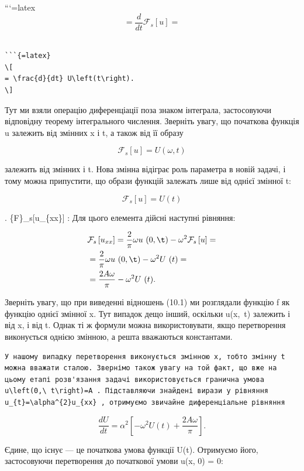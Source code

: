 \documentclass[
  ukrainian,
]{article}
\begin{document}
```{=latex}
\[
= \frac{d}{dt} \mathcal{F}_{s}\left[u\right] =
\]

\begin{verbatim}

```{=latex}
\[
= \frac{d}{dt} U\left(t\right).
\]
\end{verbatim}

Тут ми взяли операцію диференціації поза знаком інтеграла, застосовуючи
відповідну теорему інтегрального числення. Зверніть увагу, що початкова
функція u залежить від змінних x і t, а також від її образу

\[
\mathcal{F}_{s}[u] = U(\omega, t)
\]

залежить від змінних \omega і t. Нова змінна \omega відіграє роль
параметра в новій задачі, і тому можна припустити, що образи функцій
залежать лише від однієї змінної t:

\[
\mathcal{F}_s[u] = U(t)
\]

. \{\mathscr F\}\_s{[}u\_\{xx\}{]} : Для цього елемента дійсні наступні
рівняння:

\[
\begin{split} &\mathcal{F}_s\left[u_{xx}\right] = \frac{2}{\pi} \omega u \ (0, \t) - \omega^2 \mathcal{F}_s\left[u\right] = \\ &= \frac{2}{\pi} \omega u \ (0, \t) - \omega^2 U \ (t) = \\ &= \frac{2A\omega}{\pi} - \omega^2 U \ (t). \end{split}
\]

Зверніть увагу, що при виведенні відношень (10.1) ми розглядали функцію
f як функцію однієї змінної x. Тут випадок дещо інший, оскільки
u\left(x,~t\right) залежить і від x, і від t. Однак ті ж формули можна
використовувати, якщо перетворення виконується однією змінною, а решта
вважаються константами.

\begin{verbatim}
У нашому випадку перетворення виконується змінною x, тобто змінну t можна вважати сталою. Звернімо також увагу на той факт, що вже на цьому етапі розв'язання задачі використовується гранична умова u\left(0,\ t\right)=A . Підставляючи знайдені вирази у рівняння u_{t}=\alpha^{2}u_{xx} , отримуємо звичайне диференціальне рівняння
\end{verbatim}

\[
\frac{dU}{dt} = \alpha^2 \left[ -\omega^2 U(t) + \frac{2A\omega}{\pi} \right].
\]

Єдине, що існує --- це початкова умова функції U(t). Отримуємо його,
застосовуючи перетворення до початкової умови u(x, 0) = 0:
\end{document}
